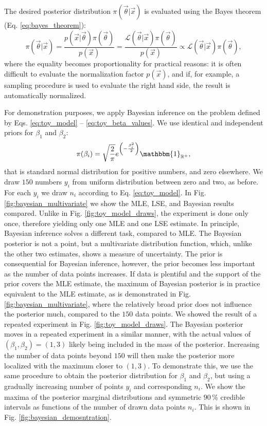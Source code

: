 The desired posterior distribution $\pi(\vec{\theta}|\vec{x})$ is evaluated using the Bayes theorem (Eq. \ref{eq:bayes_theorem}):
\begin{equation}
    \pi(\vec{\theta}|\vec{x}) = \frac{p(\vec{x}|\vec{\theta}) \pi(\vec{\theta})}{p(\vec{x})} = \frac{\mathcal{L}(\vec{\theta}|\vec{x}) \pi(\vec{\theta})}{p(\vec{x})} \propto \mathcal{L}(\vec{\theta}|\vec{x}) \pi(\vec{\theta}),
    \label{eq:bayesian_inference}
\end{equation}
where the equality becomes proportionality for practical reasons: it is often difficult to evaluate the normalization factor $p(\vec{x})$, and if, for example, a sampling procedure is used to evaluate the right hand side, the result is automatically normalized. 

For demonstration purposes, we apply Bayesian inference on the problem defined by Eqs. \ref{eq:toy_model} -- \ref{eq:toy_beta_values}. We use identical and independent priors for $\beta_1$ and $\beta_2$:
\begin{equation}
    \pi(\beta_i) = \sqrt{\frac{2}{\pi}} e^{\left(-\frac{\beta_i^2}{2}\right)} \mathbbm{1}_{\mathbb{R}^+} ,
\end{equation}
that is standard normal distribution for positive numbers, and zero elsewhere. We draw $150$ numbers $y_i$ from uniform distribution between zero and two, as before. For each $y_i$ we draw $n_i$ according to Eq. \ref{eq:toy_model}. In Fig. \ref{fig:bayesian_multivariate} we show the MLE, LSE, and Bayesian results compared. Unlike in Fig. \ref{fig:toy_model_draws}, the experiment is done only once, therefore yielding only one MLE and one LSE estimate. In principle, Bayesian inference solves a different task, compared to MLE. The Bayesian posterior is not a point, but a multivariate distribution function, which, unlike the other two estimates, shows a measure of uncertainty. The prior is consequential for Bayesian inference, however, the prior becomes less important as the number of data points increases. If data is plentiful and the support of the prior covers the MLE estimate, the maximum of Bayesian posterior is in practice equivalent to the MLE estimate, as is demonstrated in Fig. \ref{fig:bayesian_multivariate}, where the relatively broad prior does not influence the posterior much, compared to the $150$ data points. We showed the result of a repeated experiment in Fig. \ref{fig:toy_model_draws}. The Bayesian posterior moves in a repeated experiment in a similar manner, with the actual values of $(\beta_1,\beta_2) = (1,3)$ likely being included in the mass of the posterior. Increasing the number of data points beyond $150$ will then make the posterior more localized with the maximum closer to $(1,3)$. To demonstrate this, we use the same procedure to obtain the posterior distribution for $\beta_1$ and $\beta_2$, but using a gradually increasing number of points $y_i$ and corresponding $n_i$. We show the maxima of the posterior marginal distributions and symmetric $90 \, \%$ credible intervals as functions of the number of drawn data points $n_i$. This is shown in Fig. \ref{fig:bayesian_demosntration}.

